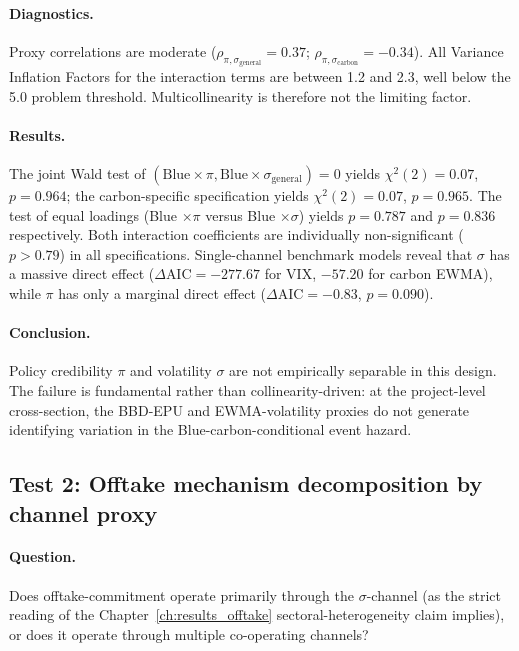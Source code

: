 \paragraph{Diagnostics.} Proxy correlations are moderate ($\rho_{\pi,\sigma_{\text{general}}} = 0.37$; $\rho_{\pi,\sigma_{\text{carbon}}} = -0.34$). All Variance Inflation Factors for the interaction terms are between 1.2 and 2.3, well below the 5.0 problem threshold. Multicollinearity is therefore not the limiting factor.

\paragraph{Results.} The joint Wald test of $(\text{Blue} \times \pi, \text{Blue} \times \sigma_{\text{general}}) = 0$ yields $\chi^2(2) = 0.07$, $p = 0.964$; the carbon-specific specification yields $\chi^2(2) = 0.07$, $p = 0.965$. The test of equal loadings (Blue $\times \pi$ versus Blue $\times \sigma$) yields $p = 0.787$ and $p = 0.836$ respectively. Both interaction coefficients are individually non-significant ($p > 0.79$) in all specifications. Single-channel benchmark models reveal that $\sigma$ has a massive direct effect ($\Delta \text{AIC} = -277.67$ for VIX, $-57.20$ for carbon EWMA), while $\pi$ has only a marginal direct effect ($\Delta \text{AIC} = -0.83$, $p = 0.090$).

\paragraph{Conclusion.} Policy credibility $\pi$ and volatility $\sigma$ are not empirically separable in this design. The failure is fundamental rather than collinearity-driven: at the project-level cross-section, the BBD-EPU and EWMA-volatility proxies do not generate identifying variation in the Blue-carbon-conditional event hazard.

\subsection*{Test 2: Offtake mechanism decomposition by channel proxy}

\paragraph{Question.} Does offtake-commitment operate primarily through the $\sigma$-channel (as the strict reading of the Chapter~\ref{ch:results_offtake} sectoral-heterogeneity claim implies), or does it operate through multiple co-operating channels?

